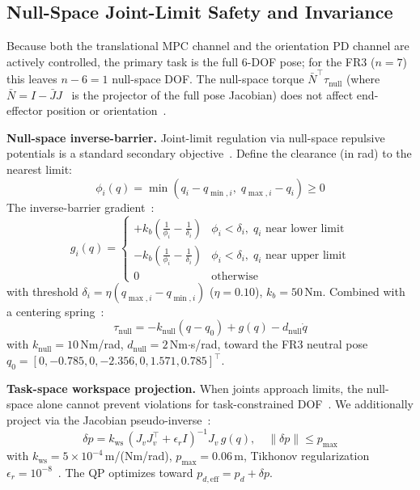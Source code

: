 \documentclass[journal]{IEEEtran}
\newcommand{\Nbar}{\bar{N}}
\begin{document}
\subsection{Null-Space Joint-Limit Safety and Invariance}\label{sec:cbf}

Because both the translational MPC channel and the orientation PD channel
are actively controlled, the primary task is the full 6-DOF pose; for the
FR3 ($n=7$) this leaves $n-6=1$ null-space DOF.
The null-space torque $\Nbar^\top\tau_{\text{null}}$ (where
$\Nbar=I-\bar{J}J$~\cite{khatib1987unified,sentis2005synthesis} is the
projector of the full pose Jacobian) does not affect end-effector position
or orientation~\cite{sentis2005synthesis}.

\textbf{Null-space inverse-barrier.}
Joint-limit regulation via null-space repulsive potentials is a standard
secondary objective~\cite{khatib1987unified,sadeghian2014task}.
Define the clearance (in rad) to the nearest limit:
\begin{equation*}
  \phi_i(q) = \min(q_i-q_{\min,i},\;q_{\max,i}-q_i)\ge 0
\end{equation*}
The inverse-barrier gradient~\cite{sadeghian2014task}:
\begin{equation}\label{eq:barrier}
  g_i(q) = \begin{cases}
    +k_b\!\left(\tfrac{1}{\phi_i}-\tfrac{1}{\delta_i}\right)
      & \phi_i<\delta_i,\;q_i\text{ near lower limit}\\
    -k_b\!\left(\tfrac{1}{\phi_i}-\tfrac{1}{\delta_i}\right)
      & \phi_i<\delta_i,\;q_i\text{ near upper limit}\\
    0 & \text{otherwise}
  \end{cases}
\end{equation}
with threshold $\delta_i=\eta(q_{\max,i}-q_{\min,i})$ ($\eta=0.10$),
$k_b=50$\,Nm.
Combined with a centering spring~\cite{sentis2005synthesis}:
\begin{equation}\label{eq:tnull}
  \tau_{\text{null}} = -k_{\text{null}}(q-q_0)+g(q)-d_{\text{null}}\dot{q}
\end{equation}
with $k_{\text{null}}=10$\,Nm/rad, $d_{\text{null}}=2$\,Nm$\cdot$s/rad,
toward the FR3 neutral pose
$q_0=[0,-0.785,0,-2.356,0,1.571,0.785]^\top$.

\textbf{Task-space workspace projection.}
When joints approach limits, the null-space alone cannot prevent
violations for task-constrained DOF~\cite{sadeghian2014task}.
We additionally project via the Jacobian
pseudo-inverse~\cite{khatib1987unified}:
\begin{equation}\label{eq:projection}
  \delta p = k_{\text{ws}}\,(J_vJ_v^\top+\epsilon_r I)^{-1}J_v\,g(q),
  \quad\|\delta p\|\leq p_{\max}
\end{equation}
with $k_{\text{ws}}=5\times10^{-4}$\,m/(Nm/rad), $p_{\max}=0.06$\,m,
Tikhonov regularization $\epsilon_r=10^{-8}$~\cite{siciliano2009robotics}.
The QP optimizes toward $p_{d,\text{eff}}=p_d+\delta p$.
\end{document}

